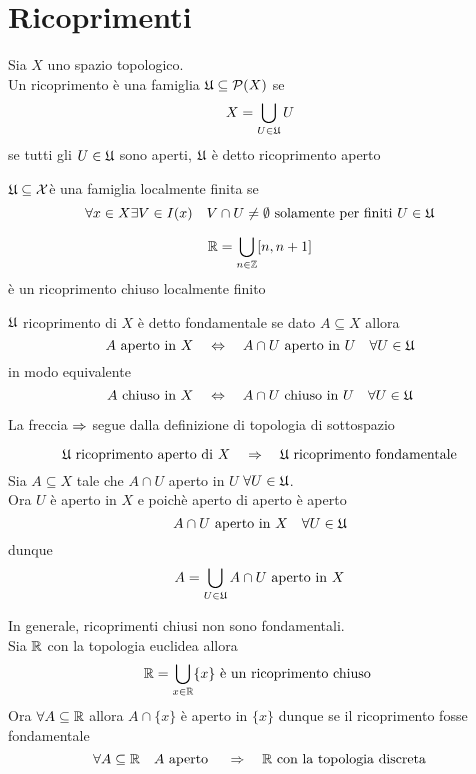 \section{Ricoprimenti}
\begin{defn}[Ricoprimento]\bianco
Sia $X$ uno spazio topologico.\\
Un ricoprimento \`e una famiglia $\mathfrak{U} \subseteq \mathcal{P}(X)$ se
$$ X = \bigcup_{U \in \mathfrak{U}} U $$
se tutti gli $U \in \mathfrak{U}$ sono aperti, $\mathfrak{U}$ \`e detto ricoprimento aperto 
\end{defn}
\spazio
\begin{defn}\bianco $\mathfrak{U} \subseteq \mathcal{X}$\`e una famiglia localmente finita se 
$$ \forall x \in X \exists V \in I(x) \quad V \cap U \neq \emptyset \text{ solamente per finiti } U \in \mathfrak{U} $$
\end{defn}
\begin{ese} 
$$ \mathbb{R}= \bigcup_{n \in \mathbb{Z}} [n, n+1]$$
\`e un ricoprimento chiuso localmente finito
\end{ese}
\spazio
\begin{defn}\bianco
$\mathfrak{U}$ ricoprimento di $X$ \`e detto fondamentale se dato $A \subseteq X $ allora
$$ A \text{ aperto in } X \quad \Leftrightarrow \quad A \cap U \text{ aperto in } U \quad \forall U \in \mathfrak{U} $$
in modo equivalente
$$ A \text{ chiuso in } X \quad \Leftrightarrow \quad A \cap U \text{ chiuso in } U \quad \forall U \in \mathfrak{U} $$
\begin{oss}La freccia $\Rightarrow$ segue dalla definizione di topologia di sottospazio
\end{oss}
\end{defn}
\spazio
\begin{prop} $$\mathfrak{U} \text{ ricoprimento aperto di  } X \quad \Rightarrow \quad  \mathfrak{U} \text{ ricoprimento fondamentale}$$
\proof
Sia $A\subseteq X $ tale che $A\cap U $ aperto in $U$ $\forall U \in \mathfrak{U}$.\\
Ora $U$ \`e aperto in $X$ e poich\`e aperto di aperto \`e aperto\\
$$ A\cap U \text { aperto in } X \quad  \forall U \in \mathfrak{U} $$
dunque 
$$A = \bigcup_{U \in \mathfrak{U}} A \cap U \text{ aperto in } X $$
\end{prop}
\begin{oss}In generale, ricoprimenti chiusi non sono fondamentali.\\
Sia $\mathbb{R}$ con la topologia euclidea allora
$$ \mathbb{R}= \bigcup_{x \in \mathbb{R}} \{ x \} \text{ \`e un ricoprimento chiuso } $$
Ora  $ \forall A\subseteq \mathbb{R}$ allora $A\cap \{x\}$ \`e aperto in $\{x\}$ dunque se il ricoprimento fosse fondamentale
$$ \forall A \subseteq \mathbb{R} \quad A \text{ aperto } \quad \Rightarrow \quad \mathbb{R} \text{ con la topologia discreta}$$ 
\end{oss}
